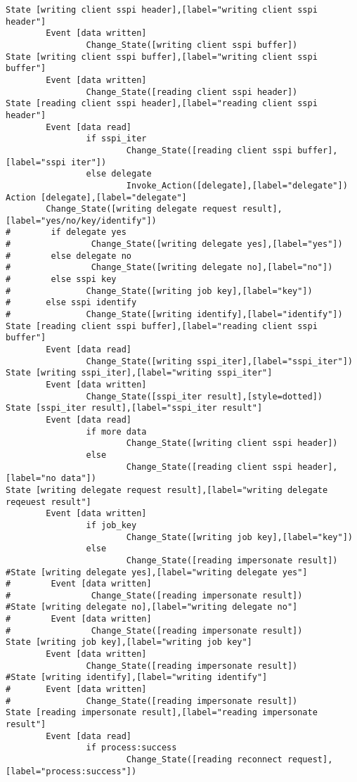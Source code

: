\begin{verbatim}
State [writing client sspi header],[label="writing client sspi header"]
        Event [data written]
                Change_State([writing client sspi buffer])
State [writing client sspi buffer],[label="writing client sspi buffer"]
        Event [data written]
                Change_State([reading client sspi header])
State [reading client sspi header],[label="reading client sspi header"]
        Event [data read]
                if sspi_iter
                        Change_State([reading client sspi buffer],[label="sspi iter"])
                else delegate
                        Invoke_Action([delegate],[label="delegate"])
Action [delegate],[label="delegate"]
		Change_State([writing delegate request result],[label="yes/no/key/identify"])
#        if delegate yes
#                Change_State([writing delegate yes],[label="yes"])
#        else delegate no
#                Change_State([writing delegate no],[label="no"])
#        else sspi key
#				Change_State([writing job key],[label="key"])
#		else sspi identify
#				Change_State([writing identify],[label="identify"])
State [reading client sspi buffer],[label="reading client sspi buffer"]
        Event [data read]
                Change_State([writing sspi_iter],[label="sspi_iter"])
State [writing sspi_iter],[label="writing sspi_iter"]
        Event [data written]
                Change_State([sspi_iter result],[style=dotted])
State [sspi_iter result],[label="sspi_iter result"]
        Event [data read]
				if more data
						Change_State([writing client sspi header])
				else
						Change_State([reading client sspi header],[label="no data"])
State [writing delegate request result],[label="writing delegate reqeuest result"]
		Event [data written]
				if job_key
						Change_State([writing job key],[label="key"])
				else
						Change_State([reading impersonate result])
#State [writing delegate yes],[label="writing delegate yes"]
#        Event [data written]
#                Change_State([reading impersonate result])
#State [writing delegate no],[label="writing delegate no"]
#        Event [data written]
#                Change_State([reading impersonate result])
State [writing job key],[label="writing job key"]
		Event [data written]
				Change_State([reading impersonate result])
#State [writing identify],[label="writing identify"]
#		Event [data written]
#				Change_State([reading impersonate result])
State [reading impersonate result],[label="reading impersonate result"]
        Event [data read]
                if process:success
                        Change_State([reading reconnect request],[label="process:success"])

\end{verbatim}
